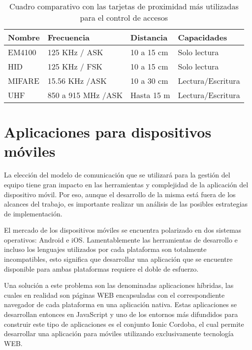 \begin{table}[ht]
	\centering
	\caption[Tarjetas de proximidad más utilizadas en el control de accesos]{Cuadro comparativo con las tarjetas de proximidad más utilizadas para el control de accesos}
	\begin{tabular}{C{15mm} C{40mm} C{25mm} C{35mm}}
		\toprule
		\textbf{Nombre} 	
			& \textbf{Frecuencia}
			& \textbf{Distancia}	
			& \textbf{Capacidades}
			\\
		\midrule
			EM4100 			
			& 125 KHz / ASK
			& 10 a 15 cm	
			& Solo lectura
			\\
			HID 			
			& 125 KHz / FSK
			& 10 a 15 cm	
			& Solo lectura
			\\
			MIFARE 			
			& 15.56 KHz /ASK
			& 10 a 30 cm	
			& Lectura/Escritura
			\\
			UHF 			
			& 850 a 915 MHz /ASK
			& Hasta 15 m	
			& Lectura/Escritura
			\\
		\bottomrule
		\hline
	\end{tabular}
	\label{tab:TarjetasUsadas}
\end{table}

\section{Aplicaciones para dispositivos móviles}
\label{sec:AplicacionesMoviles}
La elección del modelo de comunicación que se utilizará para la gestión del equipo tiene gran impacto en las herramientas y complejidad de la aplicación del dispositivo móvil. Por eso, aunque el desarrollo de la misma está fuera de los alcances del trabajo, es importante realizar un análisis de las posibles estrategias de implementación.

El mercado de los dispositivos móviles se encuentra polarizado en dos sistemas operativos: Android e iOS. Lamentablemente las herramientas de desarrollo e incluso los lenguajes utilizados por cada plataforma son totalmente incompatibles, esto significa que desarrollar una aplicación que se encuentre disponible para ambas plataformas requiere el doble de esfuerzo. 

Una solución a este problema son las denominadas aplicaciones híbridas, las cuales en realidad son páginas WEB encapsuladas con el correspondiente navegador de cada plataforma en una aplicación nativa. Estas aplicaciones se desarrollan entonces en JavaScript y uno de los entornos más difundidos para construir este tipo de aplicaciones es el conjunto Ionic Cordoba, el cual permite desarrollar una aplicación para móviles utilizando exclusivamente tecnología WEB. 


